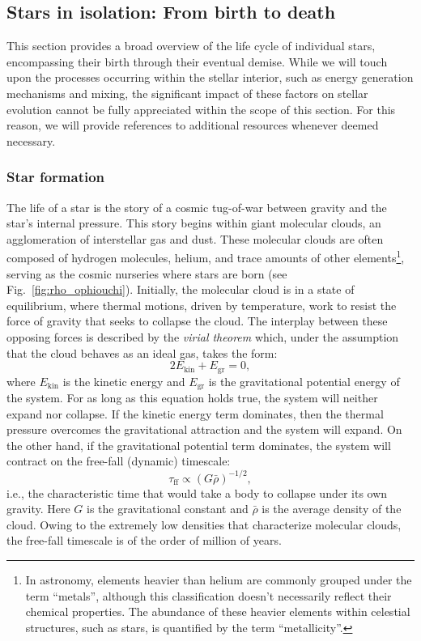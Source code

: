 \documentclass[main.tex]{subfiles}
\begin{document}
    \subsection{Stars in isolation: From birth to death}
    This section provides a broad overview of the life cycle of individual stars, encompassing their birth through their eventual demise. While we will touch upon the processes occurring within the stellar interior, such as energy generation mechanisms and mixing, the significant impact of these factors on stellar evolution cannot be fully appreciated within the scope of this section. For this reason, we will provide references to additional resources whenever deemed necessary.
    
    \subsubsection{Star formation}
    The life of a star is the story of a cosmic tug-of-war between gravity and the star's internal pressure. This story begins within giant molecular clouds, an agglomeration of interstellar gas and dust. These molecular clouds are often composed of hydrogen molecules, helium, and trace amounts of other elements\footnote{In astronomy, elements heavier than helium are commonly grouped under the term ``metals'', although this classification doesn't necessarily reflect their chemical properties. The abundance of these heavier elements within celestial structures, such as stars, is quantified by the term ``metallicity''.}, serving as the cosmic nurseries where stars are born (see Fig.~\ref{fig:rho_ophiouchi}).
    Initially, the molecular cloud is in a state of equilibrium, where thermal motions, driven by temperature, work to resist the force of gravity that seeks to collapse the cloud. The interplay between these opposing forces is described by the \textit{virial theorem} which, under the assumption that the cloud behaves as an ideal gas, takes the form:
    \begin{equation}\label{eq:virial}
        2E_\mathrm{kin} + E_\mathrm{gr} = 0,
    \end{equation}
    where $E_\mathrm{kin}$ is the kinetic energy and $E_\mathrm{gr}$ is the gravitational potential energy of the system. For as long as this equation holds true, the system will neither expand nor collapse. If the kinetic energy term dominates, then the thermal pressure overcomes the gravitational attraction and the system will expand. On the other hand, if the gravitational potential term dominates, the system will contract on the free-fall (dynamic) timescale:
    \begin{equation}\label{eq:dynamical_timescale}
        \tau_\mathrm{ff} \propto (G\bar{\rho})^{-1/2},
    \end{equation}
    i.e., the characteristic time that would take a body to collapse under its own gravity. Here $G$ is the gravitational constant and $\bar{\rho}$ is the average density of the cloud. Owing to the extremely low densities that characterize molecular clouds, the free-fall timescale is of the order of million of years.
\end{document}
